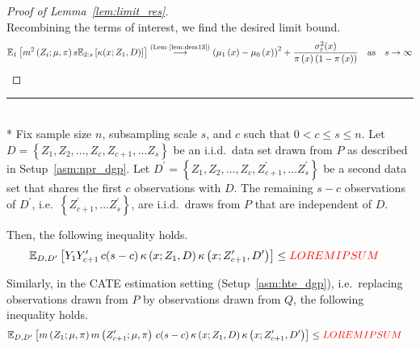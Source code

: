 \begin{proof}[Proof of Lemma~\ref{lem:limit_res}]
\begin{equation}
	\end{equation}
	Recombining the terms of interest, we find the desired limit bound.
	\begin{equation}
		\begin{aligned}
			\mathbb{E}_{1}\left[m^2\left(Z_{i}; \mu, \pi\right) s \mathbb{E}_{2:s}\left[\kappa(x; Z_1, D)\right]\right]
			\overset{\text{(Lem~\ref{lem:dem13})}}{\longrightarrow} \left(\mu_1\left(x\right) - \mu_0\left(x\right)\right)^2 + \frac{\sigma_{\varepsilon}^2(x)}{\pi\left(x\right)\left(1 - \pi\left(x\right)\right)}
			\quad \text{as} \quad s \rightarrow \infty
		\end{aligned}
	\end{equation}
\end{proof}

\hrule

\begin{lem}\label{lem:kern_ineq}\mbox{}\\*
	Fix sample size $n$, subsampling scale $s$, and $c$ such that $0 < c \leq s \leq n$.
	Let $D = \left\{Z_1, Z_2, \dotsc, Z_c, Z_{c+1}, \dotsc Z_s \right\}$ be an i.i.d.\ data set drawn from $P$ as described in Setup~\ref{asm:npr_dgp}.
	Let $D^{\prime} = \left\{Z_1, Z_2, \dotsc, Z_c, Z_{c+1}^{\prime}, \dotsc Z_s^{\prime} \right\}$ be a second data set that shares the first $c$ observations with $D$.
	The remaining $s - c$ observations of $D^{\prime}$, i.e.\ $\left\{Z_{c+1}^{\prime}, \dotsc Z_s^{\prime} \right\}$, are i.i.d.\ draws from $P$ that are independent of $D$.

	Then, the following inequality holds.
	\begin{equation}
		\begin{aligned}
			\mathbb{E}_{D, D^{\prime}}\left[Y_{1}Y_{c+1}^{\prime} \, c(s-c) \, \kappa\left(x; Z_{1}, D\right)\kappa\left(x; Z_{c+1}^{\prime}, D^{\prime}\right)\right]
			& \leq {\color{red} LOREM IPSUM}
		\end{aligned}
	\end{equation}

	Similarly, in the CATE estimation setting (Setup~\ref{asm:hte_dgp}), i.e.\ replacing observations drawn from $P$ by observations drawn from $Q$, the following inequality holds.
	\begin{equation}
		\begin{aligned}
			\mathbb{E}_{D, D^{\prime}}\left[m\left(Z_{1}; \mu, \pi\right) m\left(Z_{c+1}^{\prime}; \mu, \pi\right) \, c(s-c) \, \kappa\left(x; Z_{1}, D\right)\kappa\left(x; Z_{c+1}^{\prime}, D^{\prime}\right)\right]
			& \leq {\color{red} LOREM IPSUM}
		\end{aligned}
	\end{equation}
\end{lem}

